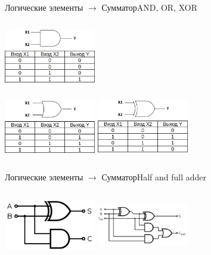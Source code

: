 \documentclass[10pt]{beamer}
\begin{document}
\begin{frame}[fragile]{Логические элементы $\rightarrow$ Сумматор}{AND, OR, XOR}
\begin{multicols}{2}
\includegraphics[width=4cm, height=3cm]{Term_1/Source/Pirctures/and.jpg}\\
\includegraphics[width=4cm, height=3cm]{Term_1/Source/Pirctures/or.jpg}
\vfill\eject
\includegraphics[width=4cm, height=3cm]{Term_1/Source/Pirctures/xor.jpg}
\end{multicols}
\end{frame}


\begin{frame}[fragile]{Логические элементы $\rightarrow$ Сумматор}{Half and full adder}
\begin{multicols}{2}
\includegraphics[width=4cm, height=3cm]{Term_1/Source/Pirctures/Half_Adder.png}
\vfill\eject
\includegraphics[width=4cm, height=3cm]{Term_1/Source/Pirctures/Full_Adder.png}
\end{multicols}
\end{frame}
\end{document}
